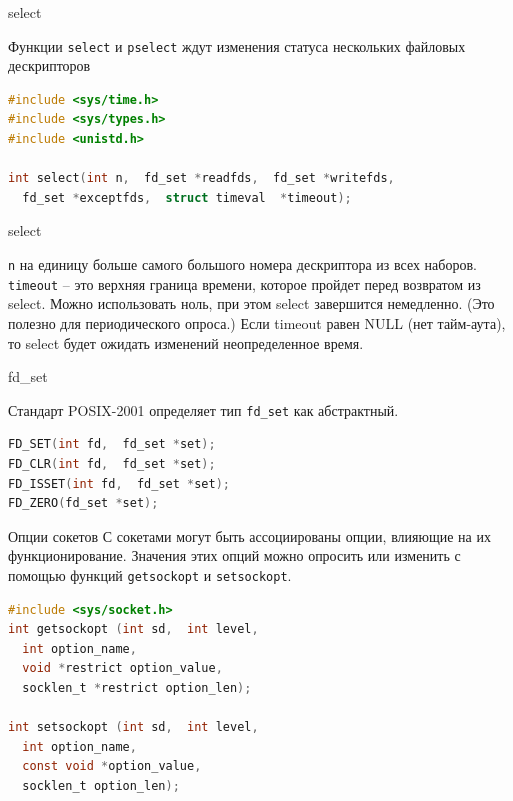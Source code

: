\begin{frame}[fragile]{select}

Функции {\tt select} и {\tt pselect} ждут изменения статуса нескольких файловых дескрипторов
\begin{lstlisting}[language=C]
#include <sys/time.h>
#include <sys/types.h>
#include <unistd.h>

int select(int n,  fd_set *readfds,  fd_set *writefds,  
  fd_set *exceptfds,  struct timeval  *timeout);
\end{lstlisting}
\end{frame}

\begin{frame}[fragile]{select}

	{\tt n} на единицу больше самого большого номера дескриптора из всех наборов.
	\bigskip
	{\tt timeout} --  это  верхняя  граница  времени,  которое пройдет перед возвратом из select.  
	Можно использовать ноль,  при этом select завершится немедленно.   (Это  полезно  для  периодического
	опроса.)   Если  timeout  равен  NULL  (нет  тайм-аута),   то  select  будет  
	ожидать изменений неопределенное время.

\end{frame}

\begin{frame}[fragile]{fd\_set}

Стандарт POSIX-2001 определяет тип {\tt fd\_set} как абстрактный.

\begin{lstlisting}[language=C]
FD_SET(int fd,  fd_set *set);
FD_CLR(int fd,  fd_set *set);
FD_ISSET(int fd,  fd_set *set);
FD_ZERO(fd_set *set);
\end{lstlisting}

\end{frame}


\begin{frame}[fragile]{Опции сокетов}
С сокетами могут быть ассоциированы опции,  влияющие на их функционирование. Значения этих опций можно опросить или изменить с помощью функций {\tt getsockopt} и {\tt setsockopt}.
\begin{lstlisting}[language=C]
#include <sys/socket.h>
int getsockopt (int sd,  int level,  
  int option_name,  
  void *restrict option_value,  
  socklen_t *restrict option_len);

int setsockopt (int sd,  int level,  
  int option_name,  
  const void *option_value,  
  socklen_t option_len);
\end{lstlisting}

\end{frame}

